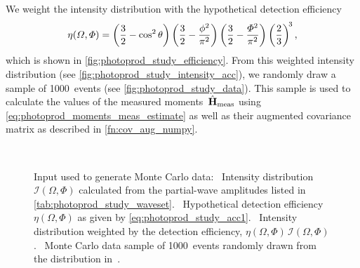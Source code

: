 We weight the intensity distribution with the hypothetical detection
efficiency
\begin{equation}
  \label{eq:photoprod_study_acc1}
  \eta(\Omega, \Phi)
  = \rBrk[3]{\frac{3}{2} - \cos^2 \theta} \rBrk[3]{\frac{3}{2} - \frac{\phi^2}{\pi^2}} \rBrk[3]{\frac{3}{2} - \frac{\Phi^2}{\pi^2}} \rBrk[3]{\frac{2}{3}}^{\!3},
\end{equation}
which is shown in \cref{fig:photoprod_study_efficiency}.  From this
weighted intensity distribution (see
\cref{fig:photoprod_study_intensity_acc}), we randomly draw a sample
of \num{1000}~events (see \cref{fig:photoprod_study_data}).  This
sample is used to calculate the values of the measured
moments~$\hat{\bm{\mathrm{H}}}_\text{meas}$ using
\cref{eq:photoprod_moments_meas_estimate} as well as their augmented
covariance matrix as described in \cref{fn:cov_aug_numpy}.

\begin{figure}[tbp]
  \centering%
  \\%
  \caption{Input used to generate Monte Carlo data:
  ~Intensity distribution
  $\mathcal{I}(\Omega, \Phi)$ calculated from the partial-wave
  amplitudes listed in \cref{tab:photoprod_study_waveset}.
  ~Hypothetical
  detection efficiency $\eta(\Omega, \Phi)$ as given by
  \cref{eq:photoprod_study_acc1}.
  ~Intensity
  distribution weighted by the detection efficiency, \ie $\eta(\Omega,
  \Phi)\, \mathcal{I}(\Omega, \Phi)$.
  ~Monte Carlo data sample of
  \num{1000}~events randomly drawn from the distribution
  in~.}%
  \label{fig:photoprod_study_input}%
\end{figure}

